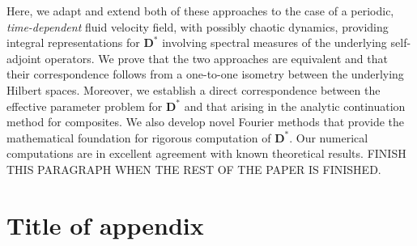 \documentclass[leqno,onefignum,onetabnum]{siamltex1213}
\newcommand{\Db}{\mathbf{D}}
\begin{document}
Here, we
adapt and extend both of these approaches to the case of a periodic,
\emph{time-dependent} fluid velocity field, with possibly chaotic
dynamics, providing integral representations for $\Db^*$ involving
spectral measures of the underlying self-adjoint operators. We prove
that the two approaches are equivalent and that their correspondence
follows from a one-to-one isometry between the underlying Hilbert
spaces. Moreover, we establish a direct correspondence between the
effective parameter problem for $\Db^*$ and that arising in the
analytic continuation method for composites. We also develop novel
Fourier methods that provide the mathematical foundation for rigorous
computation of $\Db^*$. Our numerical computations are in excellent
agreement with known theoretical results.           
FINISH THIS PARAGRAPH WHEN THE REST OF THE PAPER IS FINISHED.






\appendix
\section{Title of appendix} 



\end{document}
